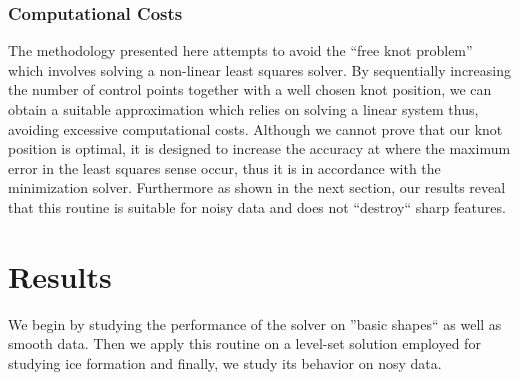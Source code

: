 \subsubsection{Computational Costs}
The methodology presented here attempts to avoid the ``free knot problem'' which involves solving a non-linear 
least squares solver. By sequentially increasing the number of control points together with a well chosen knot 
position, we can obtain a suitable approximation which relies on solving a linear system thus, avoiding excessive 
computational costs. Although we cannot prove that our knot position is optimal, it is designed to increase the accuracy 
 at where the maximum error in the least squares sense occur,
  thus it is in accordance with the minimization solver. 
  Furthermore as shown in the next section, our results reveal that this routine is suitable for 
   noisy data and does not ``destroy`` sharp features. 
   
   
\section{Results}
We begin by studying the performance of the solver on ''basic shapes`` as well as smooth data. 
Then we apply this routine on a level-set solution employed for studying ice formation and finally, we study 
 its behavior on nosy data. 
 

